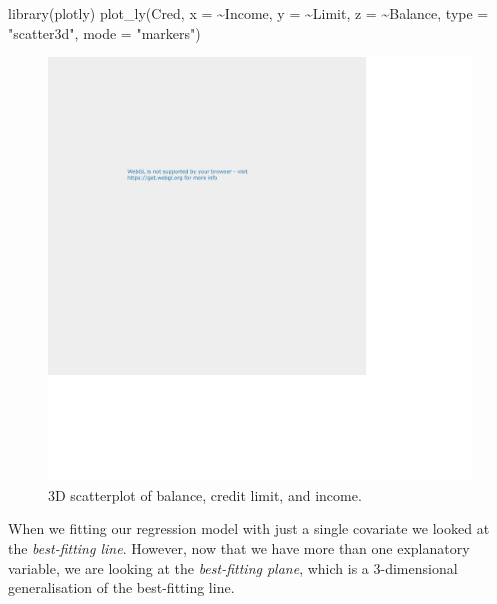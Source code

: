 \documentclass[
  letterpaper,
  DIV=11,
  numbers=noendperiod]{scrartcl}
\newenvironment{Shaded}{\begin{snugshade}}{\end{snugshade}}
\newcommand{\AttributeTok}[1]{\textcolor[rgb]{0.40,0.45,0.13}{#1}}
\newcommand{\FunctionTok}[1]{\textcolor[rgb]{0.28,0.35,0.67}{#1}}
\newcommand{\NormalTok}[1]{\textcolor[rgb]{0.00,0.23,0.31}{#1}}
\newcommand{\SpecialCharTok}[1]{\textcolor[rgb]{0.37,0.37,0.37}{#1}}
\newcommand{\StringTok}[1]{\textcolor[rgb]{0.13,0.47,0.30}{#1}}
\begin{document}
\begin{Shaded}
\begin{Highlighting}[]
\FunctionTok{library}\NormalTok{(plotly)}
\FunctionTok{plot\_ly}\NormalTok{(Cred, }\AttributeTok{x =} \SpecialCharTok{\textasciitilde{}}\NormalTok{Income, }\AttributeTok{y =} \SpecialCharTok{\textasciitilde{}}\NormalTok{Limit, }\AttributeTok{z =} \SpecialCharTok{\textasciitilde{}}\NormalTok{Balance,}
        \AttributeTok{type =} \StringTok{"scatter3d"}\NormalTok{, }\AttributeTok{mode =} \StringTok{"markers"}\NormalTok{)}
\end{Highlighting}
\end{Shaded}

\begin{figure}[H]

{\centering \includegraphics{index_files/figure-pdf/unnamed-chunk-29-1.pdf}

}

\caption{3D scatterplot of balance, credit limit, and income.}

\end{figure}%

When we fitting our regression model with just a single covariate we
looked at the \emph{best-fitting line}. However, now that we have more
than one explanatory variable, we are looking at the \emph{best-fitting
plane}, which is a 3-dimensional generalisation of the best-fitting
line.
\end{document}
